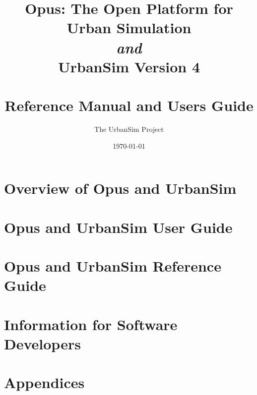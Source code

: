 \documentclass{manual}
\title{Opus: The Open Platform for \\
Urban Simulation \\
{\em and} \\
UrbanSim Version 4 \\
~\\
Reference Manual and Users Guide}
\author{The UrbanSim Project}
\date{\today}
\begin{document}
\maketitle




%
\tableofcontents



\setcounter{page}{6}
\part{Overview of Opus and UrbanSim}\label{part-overview}



\part{Opus and UrbanSim User Guide}\label{part-user-guide}




\part{Opus and UrbanSim Reference Guide}\label{part-reference-guide}





\part{Information for Software Developers}\label{part-developers}






\appendix
\part{Appendices}




\renewcommand{\indexname}{Index}

\end{document}
